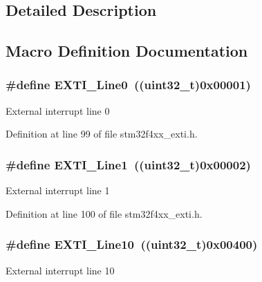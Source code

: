 \subsection{Detailed Description}


\subsection{Macro Definition Documentation}
\hypertarget{group___e_x_t_i___lines_gac2a65680200dd5f4f7eab29cd4091a75}{
\subsubsection[{E\-X\-T\-I\-\_\-\-Line0}]{\setlength{\rightskip}{0pt plus 5cm}\#define E\-X\-T\-I\-\_\-\-Line0~((uint32\-\_\-t)0x00001)}}\label{group___e_x_t_i___lines_gac2a65680200dd5f4f7eab29cd4091a75}
External interrupt line 0 

Definition at line 99 of file stm32f4xx\-\_\-exti.\-h.

\hypertarget{group___e_x_t_i___lines_gae7c6ab2a0880ce3810641ee0585104cd}{
\subsubsection[{E\-X\-T\-I\-\_\-\-Line1}]{\setlength{\rightskip}{0pt plus 5cm}\#define E\-X\-T\-I\-\_\-\-Line1~((uint32\-\_\-t)0x00002)}}\label{group___e_x_t_i___lines_gae7c6ab2a0880ce3810641ee0585104cd}
External interrupt line 1 

Definition at line 100 of file stm32f4xx\-\_\-exti.\-h.

\hypertarget{group___e_x_t_i___lines_gaefb90b266f5fc1571ed4606bbff1f1d7}{
\subsubsection[{E\-X\-T\-I\-\_\-\-Line10}]{\setlength{\rightskip}{0pt plus 5cm}\#define E\-X\-T\-I\-\_\-\-Line10~((uint32\-\_\-t)0x00400)}}\label{group___e_x_t_i___lines_gaefb90b266f5fc1571ed4606bbff1f1d7}
External interrupt line 10 

